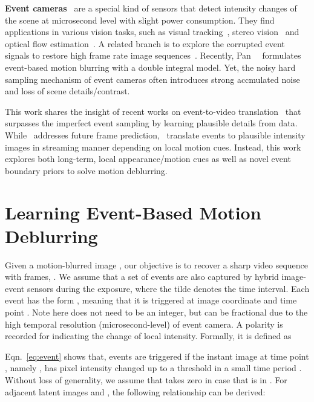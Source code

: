\documentclass[10pt,twocolumn,letterpaper]{article}
\begin{document}
\textbf{Event cameras}~\cite{LichtsteinerJSSC08,BrandliJSSC14} are a special kind of sensors that detect intensity changes of the scene at microsecond level with slight power consumption. They find applications in various vision tasks, such as visual tracking~\cite{RameshBMVC18,MitrokhinFPA18}, stereo vision~\cite{ZhuECCV18, AndreopoulosCVPR18} and optical flow estimation~\cite{LiuBMVC18,YeArXiv18}. A related branch is to explore the corrupted event signals to restore high frame rate image sequences~\cite{ScheerlinckACCV18,MundaIJCV18,ShedligeriArXiv18}. Recently, Pan~\etal~\cite{PanCVPR19} formulates event-based motion blurring with a double integral model. Yet, the noisy hard sampling mechanism of event cameras often introduces strong accmulated noise and loss of scene details/contrast. 

This work shares the insight of recent works on event-to-video translation~\cite{PiniArXiv18,MostafaviCVPR19,RebecqCVPR19} that surpasses the imperfect event sampling by learning plausible details from data. While~\cite{PiniArXiv18} addresses future frame prediction,~\cite{MostafaviCVPR19,RebecqCVPR19} translate events to plausible intensity images in streaming manner depending on local motion cues. Instead, this work explores both long-term, local appearance/motion cues as well as novel event boundary priors to solve motion deblurring.


\section{Learning Event-Based Motion Deblurring}
\label{sec:formulation}
Given a motion-blurred image , our objective is to recover a sharp video sequence with  frames, . We assume that a set of events  are also captured by hybrid image-event sensors during the exposure, where the tilde denotes the time interval. Each event  has the form , meaning that it is triggered at image coordinate  and time point . Note here  does not need to be an integer, but can be fractional due to the high temporal resolution (\ie microsecond-level) of event camera. A polarity  is recorded for  indicating the change of local intensity. Formally, it is defined as~\cite{LichtsteinerJSSC08,BrandliJSSC14}


Eqn.~\eqref{eq:event} shows that, events are triggered if the instant image at time point , namely , has pixel intensity changed up to a threshold  in a small time period . Without loss of generality, we assume that  takes zero in case that  is in . For adjacent latent images  and , the following relationship can be derived:
\end{document}

